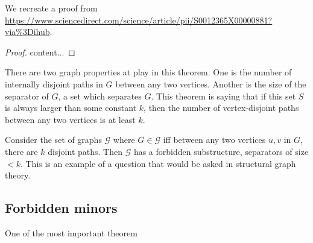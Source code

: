 \documentclass[]{article}
\theoremstyle{definition}
\numberwithin{theorem}{section}
\numberwithin{equation}{section}
\begin{document}
We recreate a proof from \url{https://www.sciencedirect.com/science/article/pii/S0012365X00000881?via%3Dihub}.
\begin{proof}
	content...
\end{proof}
There are two graph properties at play in this theorem. One is the number of internally disjoint paths in $G$ between any two vertices. Another is the size of the separator of $G$, a set which separates $G$. This theorem is saying that if this set $S$ is always larger than some constant $k$, then the number of vertex-disjoint paths between any two vertices is at least $k$. 

Consider the set of graphs $\mathcal{G}$ where $G \in \mathcal{G}$ iff between any two vertices $u, v$ in $G$, there are $k$ disjoint paths. Then $\mathcal{G}$ has a forbidden substructure, separators of size $< k$. This is an example of a question that would be asked in structural graph theory.

\subsection{Forbidden minors}
One of the most important theorem 
\end{document}
